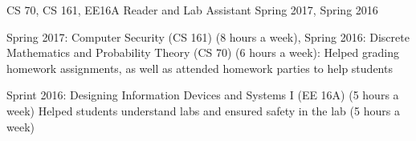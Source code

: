 \begin{cventries}
  \cventry
    {CS 70, CS 161, EE16A} %
    {Reader and Lab Assistant} %
    {Spring 2017, Spring 2016} %
    {} %
    {
      \begin{cvitems} %
        \item {Spring 2017: Computer Security (CS 161) (8 hours a week), Spring 2016: Discrete Mathematics and Probability Theory (CS 70) (6 hours a week): Helped grading homework assignments, as well as attended homework parties to help students}
         \item {Sprint 2016: Designing Information Devices and Systems I (EE 16A) (5 hours a week) Helped students understand labs and ensured safety in the lab (5 hours a week)}
      \end{cvitems}
    }

 
\end{cventries}
